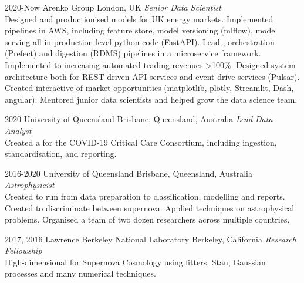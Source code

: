 \documentclass[]{friggeri-cv2}
\begin{document}
\begin{entrylist}

\entry
{2020-Now}
{Arenko Group}
{London, UK}
{\emph{Senior Data Scientist} \\
Designed and productionised  models for UK energy markets.
Implemented  pipelines in AWS, including feature store, model versioning (mlflow), model serving all in production level python code (FastAPI).
Lead , orchestration (Prefect) and digestion (RDMS) pipelines in a microservice framework.
Implemented  to increasing automated trading revenues >100\%.
Designed system architecture both for REST-driven API services and event-drive services (Pulsar).
Created interactive  of market opportunities (matplotlib, plotly, Streamlit, Dash, angular).
Mentored junior data scientists and helped grow the data science team.}

\entry
{2020}
{University of Queensland}
{Brisbane, Queensland, Australia}
{\emph{Lead Data Analyst} \\
Created a  for the COVID-19 Critical Care Consortium, including ingestion, standardisation, and reporting.}

\entry
{2016-2020}
{University of Queensland}
{Brisbane, Queensland, Australia}
{\emph{Astrophysicist} \\
Created  to run from data preparation to classification, modelling and reports. 
Created  to discriminate between supernova. 
Applied  techniques on astrophysical problems.
Organised a team of two dozen researchers across multiple countries.}


\entry
{2017, 2016}
{Lawrence Berkeley National Laboratory}
{Berkeley, California}
{\emph{Research Fellowship} \\
High-dimensional  for Supernova Cosmology using  fitters, Stan, Gaussian processes and many numerical techniques.}



\end{entrylist}
\end{document}
